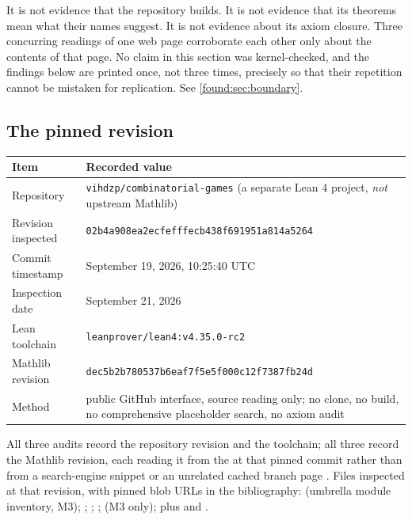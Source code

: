 \documentclass[11pt,letterpaper]{article}
\numberwithin{equation}{section}
\theoremstyle{definition}
\theoremstyle{remark}
\begin{document}
It is not evidence that the repository builds. It is not evidence that its
theorems mean what their names suggest. It is not evidence about its axiom
closure. Three concurring readings of one web page corroborate each other only
about the contents of that page. No claim in this section was kernel-checked,
and the findings below are printed once, not three times, precisely so that
their repetition cannot be mistaken for replication. See
\cref{found:sec:boundary}.

\subsection{The pinned revision}
\label{found:sub:pinned}
\begin{center}\small
\begin{tabular}{@{}P{0.28\textwidth}P{0.62\textwidth}@{}}
\toprule
Item & Recorded value\\\midrule
Repository & \texttt{vihdzp/combinatorial-games} (a separate Lean 4 project,
\emph{not} upstream Mathlib)\\
Revision inspected & \texttt{02b4a908ea2ecfefffecb438f691951a814a5264}\\
Commit timestamp & September 19, 2026, 10:25:40 UTC\\
Inspection date & September 21, 2026\\
Lean toolchain & \texttt{leanprover/lean4:v4.35.0-rc2}\\
Mathlib revision & \texttt{dec5b2b780537b6eaf7f5e5f000c12f7387fb24d}\\
Method & public GitHub interface, source reading only; no clone, no build, no
comprehensive placeholder search, no axiom audit\\
\bottomrule
\end{tabular}
\end{center}

All three audits record the repository revision and the toolchain; all three
record the Mathlib revision, each reading it from the 
at that pinned commit rather than from a search-engine snippet or an unrelated
cached branch page
\cite{found:GamesRepo,found:GamesToolchain,found:GamesManifest}. Files inspected
at that revision, with pinned blob URLs in the bibliography:
 (umbrella module inventory, M3);
;
;
;
 (M3 only); plus
 and .
\end{document}
